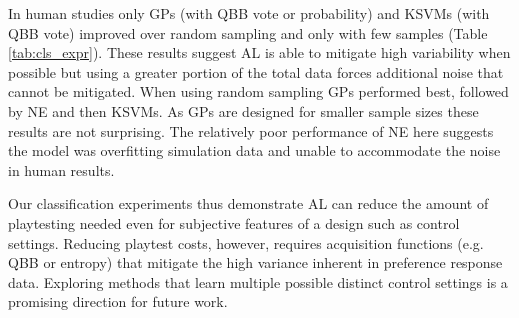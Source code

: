 \documentclass{sig-alternate}
\begin{document}
\begin{table}[tb]
%
\label{tab:cls_expr}
\end{table}

In human studies only GPs (with QBB vote or probability) and KSVMs (with QBB vote) improved over random sampling and only with few samples (Table \ref{tab:cls_expr}).
These results suggest AL is able to mitigate high variability when possible but using a greater portion of the total data forces additional noise that cannot be mitigated.
When using random sampling GPs performed best, followed by NE and then KSVMs.
As GPs are designed for smaller sample sizes these results are not surprising.
The relatively poor performance of NE here suggests the model was overfitting simulation data and unable to accommodate the noise in human results.


Our classification experiments thus demonstrate AL can reduce the amount of playtesting needed even for subjective features of a design such as control settings.
Reducing playtest costs, however, requires acquisition functions (e.g. QBB or entropy) that mitigate the high variance inherent in preference response data.
Exploring methods that learn multiple possible distinct control settings is a promising direction for future work.
\end{document}
